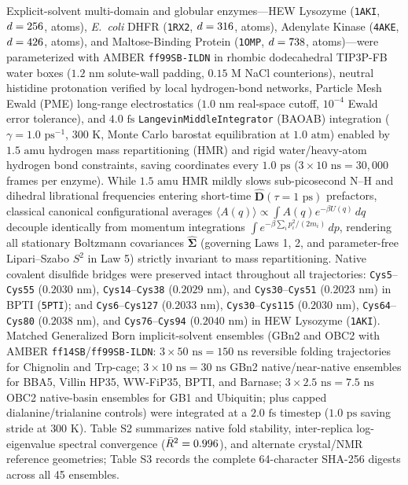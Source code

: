 \documentclass[10pt,letterpaper]{article}
\begin{document}
Explicit-solvent multi-domain and globular enzymes---HEW Lysozyme (\texttt{1AKI}, $d=256{}$, \vFourExplicitParticlesLysozyme{} atoms), \textit{E.\ coli} DHFR (\texttt{1RX2}, $d=316{}$, \vFourExplicitParticlesDhfr{} atoms), Adenylate Kinase (\texttt{4AKE}, $d=426{}$, \vFourExplicitParticlesAdk{} atoms), and Maltose-Binding Protein (\texttt{1OMP}, $d=738{}$, \vFourMaxExplicitAtomsMbp{} atoms)---were parameterized with AMBER \texttt{ff99SB-ILDN} in rhombic dodecahedral TIP3P-FB water boxes ($1.2\text{ nm}$ solute-wall padding, $0.15\text{ M}$ NaCl counterions), neutral histidine protonation verified by local hydrogen-bond networks, Particle Mesh Ewald (PME) long-range electrostatics ($1.0\text{ nm}$ real-space cutoff, $10^{-4}$ Ewald error tolerance), and $4.0\text{ fs}$ \texttt{LangevinMiddleIntegrator} (BAOAB) integration ($\gamma = 1.0\text{ ps}^{-1}$, $300\text{ K}$, Monte Carlo barostat equilibration at $1.0\text{ atm}$) enabled by $1.5\text{ amu}$ hydrogen mass repartitioning (HMR) and rigid water/heavy-atom hydrogen bond constraints, saving coordinates every $1.0\text{ ps}$ ($3 \times 10\text{ ns} = 30{,}000$ frames per enzyme). While $1.5\text{ amu}$ HMR mildly slows sub-picosecond N--H and dihedral librational frequencies entering short-time $\hat{\mathbf{D}}(\tau = 1\text{ ps})$ prefactors, classical canonical configurational averages $\langle A(q)\rangle \propto \int A(q)e^{-\beta U(q)}\,dq$ decouple identically from momentum integrations $\int e^{-\beta \sum_i p_i^2/(2m_i)}\,dp$, rendering all stationary Boltzmann covariances $\hat{\bm{\Sigma}}$ (governing Laws 1, 2, and parameter-free Lipari--Szabo $S^2$ in Law 5) strictly invariant to mass repartitioning. Native covalent disulfide bridges were preserved intact throughout all trajectories: \texttt{Cys5}--\texttt{Cys55} ($0.2030\text{ nm}$), \texttt{Cys14}--\texttt{Cys38} ($0.2029\text{ nm}$), and \texttt{Cys30}--\texttt{Cys51} ($0.2023\text{ nm}$) in BPTI (\texttt{5PTI}); and \texttt{Cys6}--\texttt{Cys127} ($0.2033\text{ nm}$), \texttt{Cys30}--\texttt{Cys115} ($0.2030\text{ nm}$), \texttt{Cys64}--\texttt{Cys80} ($0.2038\text{ nm}$), and \texttt{Cys76}--\texttt{Cys94} ($0.2040\text{ nm}$) in HEW Lysozyme (\texttt{1AKI}). Matched Generalized Born implicit-solvent ensembles (GBn2 and OBC2 with AMBER \texttt{ff14SB}/\texttt{ff99SB-ILDN}: $3\times 50\text{ ns} = 150\text{ ns}$ reversible folding trajectories for Chignolin and Trp-cage; $3\times 10\text{ ns} = 30\text{ ns}$ GBn2 native/near-native ensembles for BBA5, Villin HP35, WW-FiP35, BPTI, and Barnase; $3\times 2.5\text{ ns} = 7.5\text{ ns}$ OBC2 native-basin ensembles for GB1 and Ubiquitin; plus capped dialanine/trialanine controls) were integrated at a $2.0\text{ fs}$ timestep ($1.0\text{ ps}$ saving stride at $300\text{ K}$). Table S2 summarizes native fold stability, inter-replica log-eigenvalue spectral convergence ($\bar{R}^2 = 0.996{}$), and alternate crystal/NMR reference geometries; Table S3 records the complete 64-character SHA-256 digests across all 45 ensembles.
\end{document}
